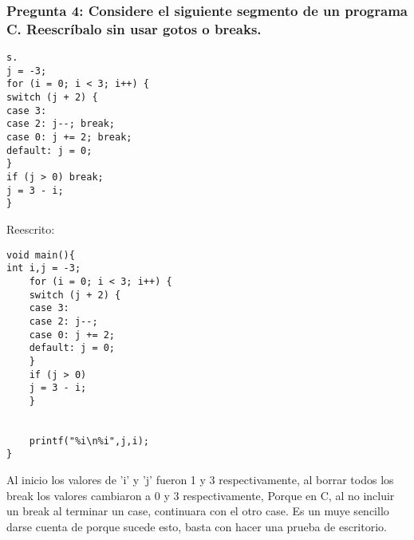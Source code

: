 \subsubsection{Pregunta 4: Considere el siguiente segmento de un programa C. Reescríbalo sin usar gotos o breaks.}

\lstset{language = C++} 
\begin{lstlisting}[frame = single] %Comienzo del Código
s.
j = -3;
for (i = 0; i < 3; i++) {
switch (j + 2) {
case 3:
case 2: j--; break;
case 0: j += 2; break;
default: j = 0;
}
if (j > 0) break;
j = 3 - i;
}
\end{lstlisting}

Reescrito:\\

\lstset{language = C++} 
\begin{lstlisting}[frame = single] %Comienzo del Código
void main(){
int i,j = -3;
	for (i = 0; i < 3; i++) {
	switch (j + 2) {
	case 3:
	case 2: j--;
	case 0: j += 2;
	default: j = 0;
	}
	if (j > 0)
	j = 3 - i;
	}


	printf("%i\n%i",j,i);
}
\end{lstlisting}

Al inicio los valores de 'i' y 'j' fueron 1 y 3 respectivamente, al borrar todos los break los valores cambiaron a 0 y 3 respectivamente, Porque en C, al no incluir un break al terminar un case, continuara con el otro case. Es un muye sencillo darse cuenta de porque sucede esto, basta con hacer una prueba de escritorio.\\


